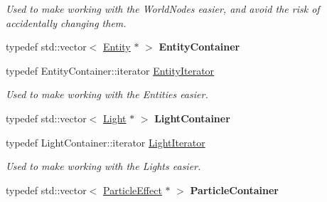 \begin{DoxyCompactItemize}
\begin{DoxyCompactList}\small\item\em Used to make working with the WorldNodes easier, and avoid the risk of accidentally changing them. \item\end{DoxyCompactList}\item 
\hypertarget{classMezzanine_1_1SceneManager_acaefae7eaf587b826c524f9aae4b35aa}{
typedef std::vector$<$ \hyperlink{classMezzanine_1_1Entity}{Entity} $\ast$ $>$ {\bfseries EntityContainer}}
\label{classMezzanine_1_1SceneManager_acaefae7eaf587b826c524f9aae4b35aa}

\item 
\hypertarget{classMezzanine_1_1SceneManager_a1e2d6cd6454bb900b31762eab8effc8b}{
typedef EntityContainer::iterator \hyperlink{classMezzanine_1_1SceneManager_a1e2d6cd6454bb900b31762eab8effc8b}{EntityIterator}}
\label{classMezzanine_1_1SceneManager_a1e2d6cd6454bb900b31762eab8effc8b}

\begin{DoxyCompactList}\small\item\em Used to make working with the Entities easier. \item\end{DoxyCompactList}\item 
\hypertarget{classMezzanine_1_1SceneManager_a4daf4d485947df11f8d5e949ec17fa5c}{
typedef std::vector$<$ \hyperlink{classMezzanine_1_1Light}{Light} $\ast$ $>$ {\bfseries LightContainer}}
\label{classMezzanine_1_1SceneManager_a4daf4d485947df11f8d5e949ec17fa5c}

\item 
\hypertarget{classMezzanine_1_1SceneManager_a70382bc80d3905971a04a77d5c6bcb33}{
typedef LightContainer::iterator \hyperlink{classMezzanine_1_1SceneManager_a70382bc80d3905971a04a77d5c6bcb33}{LightIterator}}
\label{classMezzanine_1_1SceneManager_a70382bc80d3905971a04a77d5c6bcb33}

\begin{DoxyCompactList}\small\item\em Used to make working with the Lights easier. \item\end{DoxyCompactList}\item 
\hypertarget{classMezzanine_1_1SceneManager_ad5903b96af0232de66608c9f84f8c6d0}{
typedef std::vector$<$ \hyperlink{classMezzanine_1_1ParticleEffect}{ParticleEffect} $\ast$ $>$ {\bfseries ParticleContainer}}
\label{classMezzanine_1_1SceneManager_ad5903b96af0232de66608c9f84f8c6d0}


\end{DoxyCompactItemize}
